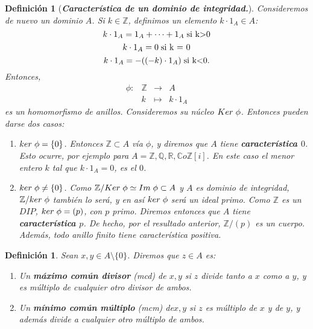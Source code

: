 \documentclass[12pt]{article}
\newtheorem{definition}[theorem]{Definición}
\begin{document}
\begin{definition}[\textbf{\textit{Característica de un dominio de integridad.}}] Consideremos de nuevo un dominio $A$. Si $k \in \mathbb{Z}$, definimos un elemento $k \cdot 1_{A} \in A$: $$k \cdot 1_{A} = 1_{A} + \cdots + 1_{A} \hspace{0.1cm} \text{si k>0}$$ $$k \cdot 1_{A} = 0 \hspace{0.1cm} \text{si k = 0}$$ $$k \cdot 1_{A} = -((-k) \cdot 1_{A}) \hspace{0.1cm} \text{si k<0}.$$
Entonces, $$\begin{array}{rccl}
\phi \colon &\mathbb{Z}&\longrightarrow &A \\
&k& \longmapsto &k\cdot 1_{A}
\end{array}
$$ es un homomorfismo de anillos. Consideremos su núcleo $Ker \hspace{0.1cm} \phi$. Entonces pueden darse dos casos: \begin{enumerate}
\item $ker \hspace{0.1cm} \phi = \lbrace 0 \rbrace$. Entonces $\mathbb{Z} \subset A$ vía $\phi$, y diremos que $A$ tiene \textbf{característica $0$}. Esto ocurre, por ejemplo para $A = \mathbb{Z}, \mathbb{Q}, \mathbb{R}, \mathbb{C} o \mathbb{Z}[i]$. En este caso el menor entero $k$ tal que $k \cdot 1_{A} = 0$, es el $0$.
\item $ker \hspace{0.1cm} \phi \neq \lbrace 0 \rbrace$. Como $\mathbb{Z}/Ker \hspace{0.1cm} \phi \simeq Im \hspace{0.1cm} \phi \subset A$ y $A$ es dominio de integridad, $\mathbb{Z}/ker \hspace{0.1cm} \phi$ también lo será, y en así $ker \hspace{0.1cm} \phi$ será un ideal primo. Como $\mathbb{Z}$ es un $DIP$, $ker \hspace{0.1cm} \phi = (p)$, con $p$ primo. Diremos entonces que $A$ tiene \textbf{característica $p$}. De hecho, por el resultado anterior, $\mathbb{Z}/(p)$ es un cuerpo. Además, todo anillo finito tiene característica positiva.
\end{enumerate}
\end{definition}

\begin{definition} Sean $x,y \in A\setminus \lbrace 0 \rbrace$. Diremos que $z \in A$ es: \begin{enumerate}
\item Un \textbf{máximo común divisor} (mcd) de $x,y$ si $z$ divide tanto a $x$ como a $y$, y es múltiplo de cualquier otro divisor de ambos.
\item Un \textbf{mínimo común múltiplo} (mcm) de$x,y$ si $z$ es múltiplo de $x$ y de $y$, y además divide a cualquier otro múltiplo de ambos.
\end{enumerate}
\end{definition}
\end{document}
